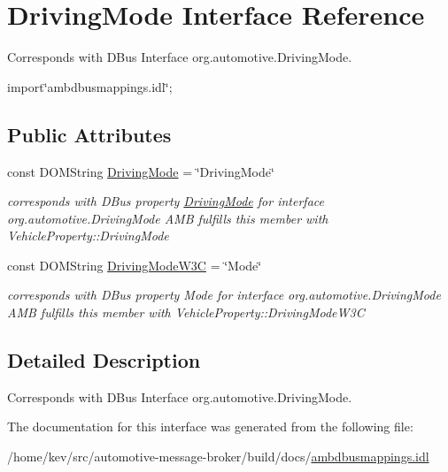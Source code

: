 \hypertarget{interfaceDrivingMode}{\section{Driving\+Mode Interface Reference}
\label{interfaceDrivingMode}
}


Corresponds with D\+Bus Interface org.\+automotive.\+Driving\+Mode.  




{\ttfamily import\char`\"{}ambdbusmappings.\+idl\char`\"{};}

\subsection*{Public Attributes}
\begin{DoxyCompactItemize}
\item 
\hypertarget{interfaceDrivingMode_a24f15f8a246ed0a61ad08ea4f6128865}{const D\+O\+M\+String \hyperlink{interfaceDrivingMode_a24f15f8a246ed0a61ad08ea4f6128865}{Driving\+Mode} = \char`\"{}Driving\+Mode\char`\"{}}\label{interfaceDrivingMode_a24f15f8a246ed0a61ad08ea4f6128865}

\begin{DoxyCompactList}\small\item\em corresponds with D\+Bus property \hyperlink{interfaceDrivingMode}{Driving\+Mode} for interface org.\+automotive.\+Driving\+Mode A\+M\+B fulfills this member with Vehicle\+Property\+::\+Driving\+Mode \end{DoxyCompactList}\item 
\hypertarget{interfaceDrivingMode_a9f051930937ada5b864954ad306a6506}{const D\+O\+M\+String \hyperlink{interfaceDrivingMode_a9f051930937ada5b864954ad306a6506}{Driving\+Mode\+W3\+C} = \char`\"{}Mode\char`\"{}}\label{interfaceDrivingMode_a9f051930937ada5b864954ad306a6506}

\begin{DoxyCompactList}\small\item\em corresponds with D\+Bus property Mode for interface org.\+automotive.\+Driving\+Mode A\+M\+B fulfills this member with Vehicle\+Property\+::\+Driving\+Mode\+W3\+C \end{DoxyCompactList}\end{DoxyCompactItemize}


\subsection{Detailed Description}
Corresponds with D\+Bus Interface org.\+automotive.\+Driving\+Mode. 

The documentation for this interface was generated from the following file\+:\begin{DoxyCompactItemize}
\item 
/home/kev/src/automotive-\/message-\/broker/build/docs/\hyperlink{ambdbusmappings_8idl}{ambdbusmappings.\+idl}\end{DoxyCompactItemize}
